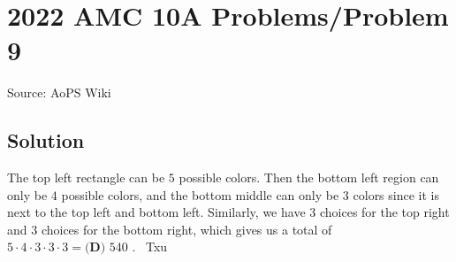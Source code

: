 \documentclass[12pt]{article}
\begin{document}
\section*{{2022 AMC 10A Problems/Problem 9}}
Source: AoPS Wiki

\subsection*{Solution}
The top left rectangle can be $5$ possible colors. Then the bottom left region can only be $4$ possible colors, and the bottom middle can only be $3$ colors since it is next to the top left and bottom left. Similarly, we have $3$ choices for the top right and $3$ choices for the bottom right, which gives us a total of $5\cdot4\cdot3\cdot3\cdot3=\boxed{\textbf{(D) }540}$ . ~Txu
\end{document}
